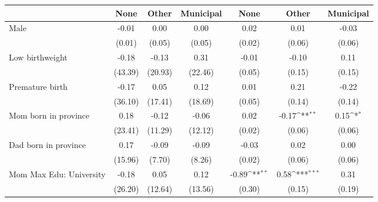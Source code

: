 {
\def\sym#1{\ifmmode^{#1}\else\(^{#1}\)\fi}
\begin{tabular}{l*{6}{c}}
\toprule
                    &\multicolumn{1}{c}{None}&\multicolumn{1}{c}{Other}&\multicolumn{1}{c}{Municipal}&\multicolumn{1}{c}{None}&\multicolumn{1}{c}{Other}&\multicolumn{1}{c}{Municipal}\\
\midrule
Male                &       -0.01         &        0.00         &        0.00         &        0.02         &        0.01         &       -0.03         \\
                    &      (0.01)         &      (0.05)         &      (0.05)         &      (0.02)         &      (0.06)         &      (0.06)         \\
\addlinespace
Low birthweight     &       -0.18         &       -0.13         &        0.31         &       -0.01         &       -0.10         &        0.11         \\
                    &     (43.39)         &     (20.93)         &     (22.46)         &      (0.05)         &      (0.15)         &      (0.15)         \\
\addlinespace
Premature birth     &       -0.17         &        0.05         &        0.12         &        0.01         &        0.21         &       -0.22         \\
                    &     (36.10)         &     (17.41)         &     (18.69)         &      (0.05)         &      (0.14)         &      (0.14)         \\
\addlinespace
Mom born in province&        0.18         &       -0.12         &       -0.06         &        0.02         &       -0.17\sym{**} &        0.15\sym{*}  \\
                    &     (23.41)         &     (11.29)         &     (12.12)         &      (0.02)         &      (0.06)         &      (0.06)         \\
\addlinespace
Dad born in province&        0.17         &       -0.09         &       -0.09         &       -0.03         &        0.02         &        0.00         \\
                    &     (15.96)         &      (7.70)         &      (8.26)         &      (0.02)         &      (0.06)         &      (0.06)         \\
\addlinespace
Mom Max Edu: University&       -0.18         &        0.05         &        0.12         &       -0.89\sym{**} &        0.58\sym{***}&        0.31         \\
                    &     (26.20)         &     (12.64)         &     (13.56)         &      (0.30)         &      (0.15)         &      (0.19)         \\

\end{tabular}}

